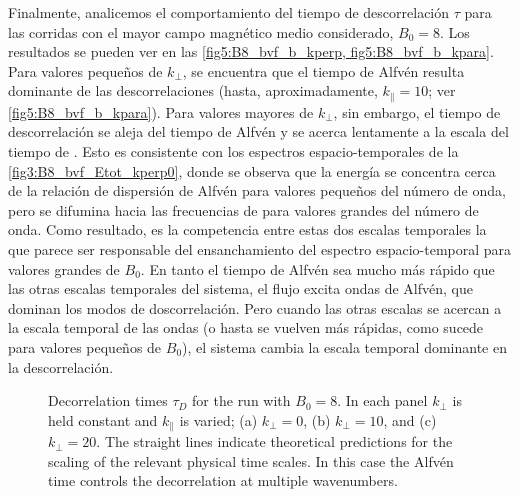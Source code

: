 Finalmente, analicemos el comportamiento del tiempo de descorrelación
$\tau$ para las corridas con el mayor campo magnético medio
considerado, $B_0=8$. Los resultados se pueden ver en las
\cref{fig5:B8_bvf_b_kperp, fig5:B8_bvf_b_kpara}. Para valores pequeños
de $k_\perp$, se encuentra que el tiempo de Alfvén resulta dominante
de las descorrelaciones (hasta, aproximadamente, $k_\parallel = 10$;
ver \cref{fig5:B8_bvf_b_kpara}). Para valores mayores de $k_{\perp}$,
sin embargo, el tiempo de descorrelación se aleja del tiempo de Alfvén
y se acerca lentamente a la escala del tiempo de \sweeping. Esto es
consistente con los espectros espacio-temporales de la
\cref{fig3:B8_bvf_Etot_kperp0}, donde se observa que la energía se
concentra cerca de la relación de dispersión de Alfvén para valores
pequeños del número de onda, pero se difumina hacia las frecuencias de
\sweeping para valores grandes del número de onda.  Como resultado, es
la competencia entre estas dos escalas temporales la que parece ser
responsable del ensanchamiento del espectro espacio-temporal para
valores grandes de $B_0$. En tanto el tiempo de Alfvén sea mucho más
rápido que las otras escalas temporales del sistema, el flujo excita
ondas de Alfvén, que dominan los modos de doscorrelación. Pero cuando
las otras escalas se acercan a la escala temporal de las ondas (o
hasta se vuelven más rápidas, como sucede para valores pequeños de
$B_0$), el sistema cambia la escala temporal dominante en la
descorrelación.

\begin{figure}
  \centering


  \caption{Decorrelation times $\tau_D$ for the run with $B_0=8$. In each
    panel $k_\perp$ is held constant and $k_\parallel$ is varied; (a)
    $k_\perp=0$, (b) $k_\perp = 10$, and (c) $k_\perp = 20$. The
    straight lines indicate theoretical predictions for
    the scaling of the relevant physical time scales. In this case the
    Alfv\'en time controls the decorrelation at multiple wavenumbers.}
  \label{fig5:B8_bvf_b_kperp}
\end{figure}

